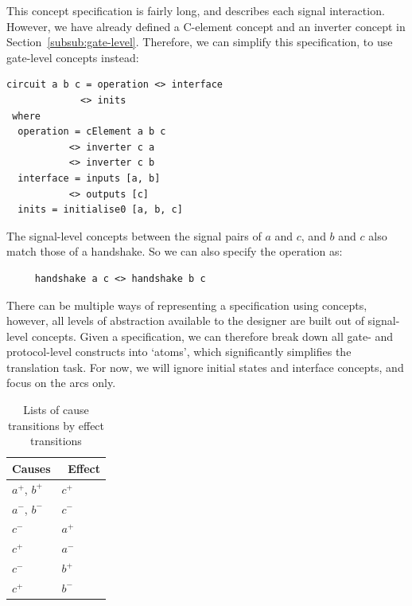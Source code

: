 \documentclass[british,conference,compsoc]{IEEEtran}
\begin{document}
\noindent This concept specification is fairly long, and describes each signal interaction.
However, we have already defined a C-element concept and an inverter concept
 in Section~\ref{subsub:gate-level}. Therefore, we can simplify this specification, 
 to use gate-level concepts instead:

\begin{verbatim}
circuit a b c = operation <> interface 
             <> inits
 where
  operation = cElement a b c 
           <> inverter c a 
           <> inverter c b
  interface = inputs [a, b] 
           <> outputs [c]
  inits = initialise0 [a, b, c]
\end{verbatim}

The signal-level concepts between the signal pairs of $a$ and $c$, and $b$ and $c$
also match those of a handshake. So we can also specify the operation as:

\begin{verbatim}
     handshake a c <> handshake b c
\end{verbatim}

\noindent There can be multiple ways of representing a specification using concepts, 
however, all levels of abstraction available to the designer are built out of signal-level
concepts. Given a specification, we can therefore break down 
all gate- and protocol-level constructs into `atoms', which significantly 
simplifies the translation task. For now, we will ignore initial states and interface
concepts, and focus on the arcs only.

\begin{table}[h]
\vspace{-2mm}
\caption{Lists of cause transitions by effect transitions
		\label{tab:list-of-concepts}}
  \centering
\begin{tabular}[htb]{| m{2.7cm} | m{2.0cm} |}
  \hline
Causes & \, Effect \\ \hline \hline
$a^{+}$, $b^{+}$		& $c^{+}$ 	\\ \hline
$a^{-}$, $b^{-}$ 		& $c^{-}$ 	\\ \hline
$c^{-}$			& $a^{+}$ 	\\ \hline
$c^{+}$			& $a^{-}$ 	\\ \hline
$c^{-}$			& $b^{+}$ 	\\ \hline
$c^{+}$			& $b^{-}$ 	\\ \hline
  \end{tabular}
  \vspace{-3mm}
\end{table}
\end{document}
